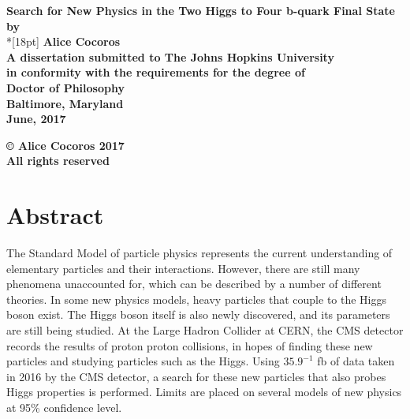 \documentclass[12pt]{report}
\begin{document}
\newcommand{\bm}[1]{ \mbox{\boldmath $ #1 $} }
\newcommand{\bin}[2]{\left(\begin{array}{@{}c@{}} #1 \\ #2
             \end{array}\right) }
\renewcommand{\contentsname}{Table of Contents}
\baselineskip=24pt
 
\thispagestyle{empty}
\begin{center}
\vspace*{.25in}
{\bf\LARGE{ Search for New Physics in the Two Higgs to Four b-quark Final State }}\\ %
\vspace*{.75in}
{\bf by} \\*[18pt]
\vspace*{.2in}
{\bf Alice Cocoros}\\ %
\vspace*{1in}
{\bf A dissertation submitted to The Johns Hopkins University\\
in conformity with the requirements for the degree of\\
Doctor of Philosophy }\\
\vspace*{.75in}
{\bf Baltimore, Maryland} \\
{\bf June, 2017} \\     %
\vspace*{.5in}
\begin{small}
{\bf \copyright{ }Alice Cocoros 2017 } \\ %
{\bf All rights reserved}
\end{small}
\end{center}
\newpage 

\pagestyle{plain}
\setcounter{page}{2}
%
\chapter*{Abstract}
The Standard Model of particle physics represents the current understanding of elementary particles and their interactions. However, there are still many phenomena unaccounted for, which can be described by a number of different theories. In some new physics models, heavy particles that couple to the Higgs boson exist. The Higgs boson itself is also newly discovered, and its parameters are still being studied. At the Large Hadron Collider at CERN, the CMS detector records the results of proton proton collisions, in hopes of finding these new particles and studying particles such as the Higgs. Using $35.9^{-1}$ fb of data taken in 2016 by the CMS detector, a search for these new particles that also probes Higgs properties is performed. Limits are placed on several models of new physics at 95\% confidence level.
\end{document}
